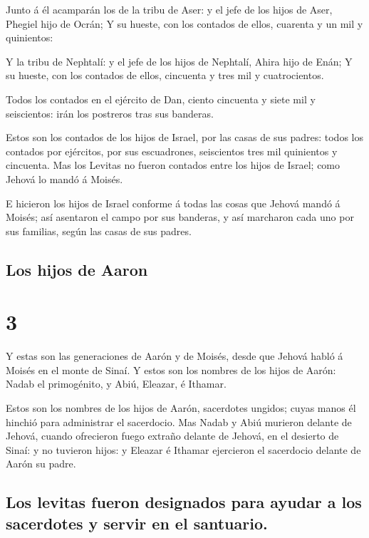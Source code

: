  Junto á él acamparán los de la tribu de Aser: y el jefe de
los hijos de Aser, Phegiel hijo de Ocrán;  Y su hueste, con
los contados de ellos, cuarenta y un mil y quinientos:

 Y la tribu de Nephtalí: y el jefe de los hijos de
Nephtalí, Ahira hijo de Enán;  Y su hueste, con los
contados de ellos, cincuenta y tres mil y cuatrocientos.

 Todos los contados en el ejército de Dan, ciento cincuenta
y siete mil y seiscientos: irán los postreros tras sus banderas.

 Estos son los contados de los hijos de Israel, por las
casas de sus padres: todos los contados por ejércitos, por sus
escuadrones, seiscientos tres mil quinientos y cincuenta. 
Mas los Levitas no fueron contados entre los hijos de Israel; como
Jehová lo mandó á Moisés.

 E hicieron los hijos de Israel conforme á todas las cosas
que Jehová mandó á Moisés; así asentaron el campo por sus banderas, y
así marcharon cada uno por sus familias, según las casas de sus padres.

\hypertarget{los-hijos-de-aaron}{%
\subsection{Los hijos de Aaron}\label{los-hijos-de-aaron}}

\hypertarget{section-2}{%
\section{3}\label{section-2}}

 Y estas son las generaciones de Aarón y de Moisés, desde
que Jehová habló á Moisés en el monte de Sinaí.  Y estos son
los nombres de los hijos de Aarón: Nadab el primogénito, y Abiú,
Eleazar, é Ithamar.

 Estos son los nombres de los hijos de Aarón, sacerdotes
ungidos; cuyas manos él hinchió para administrar el sacerdocio.
 Mas Nadab y Abiú murieron delante de Jehová, cuando
ofrecieron fuego extraño delante de Jehová, en el desierto de Sinaí: y
no tuvieron hijos: y Eleazar é Ithamar ejercieron el sacerdocio delante
de Aarón su padre.

\hypertarget{los-levitas-fueron-designados-para-ayudar-a-los-sacerdotes-y-servir-en-el-santuario.}{%
\subsection{Los levitas fueron designados para ayudar a los sacerdotes y
servir en el
santuario.}\label{los-levitas-fueron-designados-para-ayudar-a-los-sacerdotes-y-servir-en-el-santuario.}}

